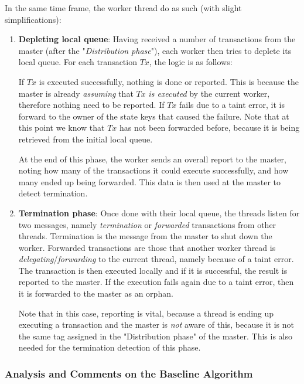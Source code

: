 In the same time frame, the worker thread do as such (with slight simplifications):

\begin{enumerate}
	\item \textbf{Depleting local queue}: Having received a number of transactions from the master
	(after the "\textit{Distribution phase}"), each worker then tries to deplete its local queue.
	For each transaction $Tx$, the logic is as follows:

	If $Tx$ is executed successfully, nothing is done or reported. This is because the master is
	already \textit{assuming} that $Tx$ \textit{is executed} by the current worker, therefore
	nothing need to be reported. If $Tx$ fails due to a taint error, it is forward to the owner of
	the state keys that caused the failure. Note that at this point we know that $Tx$ has not been
	forwarded before, because it is being retrieved from the initial local queue.

	At the end of this phase, the worker sends an overall report to the master, noting how many
	of the transactions it could execute successfully, and how many ended up being forwarded. This
	data is then used at the master to detect termination.

	\item \textbf{Termination phase}: Once done with their local queue, the threads listen for
	two messages, namely \textit{termination} or \textit{forwarded} transactions from other threads.
	Termination is the message from the master to shut down the worker. Forwarded transactions are
	those that another worker thread is \textit{delegating}/\textit{forwarding} to the current
	thread, namely because of a taint error. The transaction is then executed locally and if it is
	successful, the result is reported to the master. If the execution fails again due to a taint
	error, then it is forwarded to the master as an orphan.

	Note that in this case, reporting is vital, because a thread is ending up executing a
	transaction and the master is \textit{not} aware of this, because it is not the same tag
	assigned in the "Distribution phase" of the master. This is also needed for the termination
	detection of this phase.
\end{enumerate}

\subsubsection{Analysis and Comments on the Baseline Algorithm}

